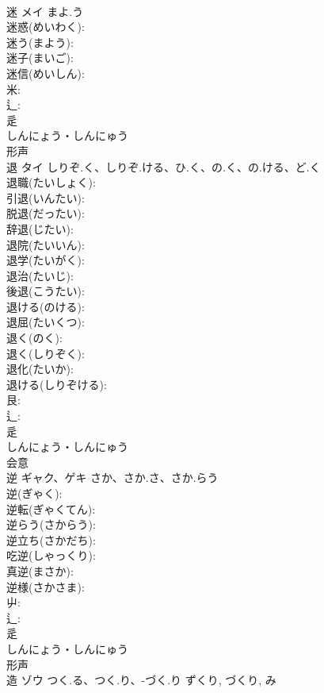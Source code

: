 \documentclass[8pt]{extreport}
\begin{document}
\begin{CJK}{UTF8}{min}
\\	迷	メイ	まよ.う		
\\	迷惑(めいわく): 
\\	迷う(まよう): 
\\	迷子(まいご): 
\\	迷信(めいしん): 
\\	米: 
\\	辶: 
\\	辵	
\\	しんにょう・しんにゅう	
\\	形声 
\\	退	タイ	しりぞ.く、しりぞ.ける、ひ.く、の.く、の.ける、ど.く		
\\	退職(たいしょく): 
\\	引退(いんたい): 
\\	脱退(だったい): 
\\	辞退(じたい): 
\\	退院(たいいん): 
\\	退学(たいがく): 
\\	退治(たいじ): 
\\	後退(こうたい): 
\\	退ける(のける): 
\\	退屈(たいくつ): 
\\	退く(のく): 
\\	退く(しりぞく): 
\\	退化(たいか): 
\\	退ける(しりぞける): 
\\	艮: 
\\	辶: 
\\	辵	
\\	しんにょう・しんにゅう	
\\	会意 
\\	逆	ギャク、ゲキ	さか、さか.さ、さか.らう		
\\	逆(ぎゃく): 
\\	逆転(ぎゃくてん): 
\\	逆らう(さからう): 
\\	逆立ち(さかだち): 
\\	吃逆(しゃっくり): 
\\	真逆(まさか): 
\\	逆様(さかさま): 
\\	屮: 
\\	辶: 
\\	辵	
\\	しんにょう・しんにゅう	
\\	形声 
\\	造	ゾウ	つく.る、つく.り、-づく.り	ずくり, づくり, み	

\end{CJK}
\end{document}
